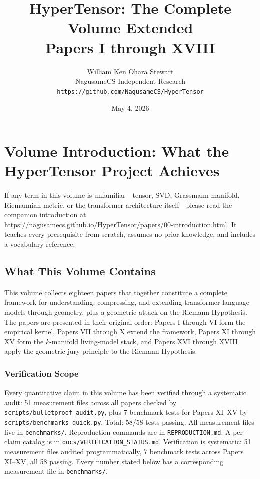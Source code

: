 \documentclass[11pt]{article}
\title{HyperTensor: The Complete Volume Extended\\\large Papers I through XVIII}
\author{William Ken Ohara Stewart\\NagusameCS Independent Research\\\texttt{https://github.com/NagusameCS/HyperTensor}}
\date{May 4, 2026}
\begin{document}
\maketitle

\section*{Volume Introduction: What the HyperTensor Project Achieves}

If any term in this volume is unfamiliar---tensor, SVD, Grassmann manifold, Riemannian metric, or the transformer architecture itself---please read the companion introduction at \url{https://nagusamecs.github.io/HyperTensor/papers/00-introduction.html}. It teaches every prerequisite from scratch, assumes no prior knowledge, and includes a vocabulary reference.

\subsection*{What This Volume Contains}

This volume collects eighteen papers that together constitute a complete framework for understanding, compressing, and extending transformer language models through geometry, plus a geometric attack on the Riemann Hypothesis. The papers are presented in their original order: Papers I through VI form the empirical kernel, Papers VII through X extend the framework, Papers XI through XV form the $k$-manifold living-model stack, and Papers XVI through XVIII apply the geometric jury principle to the Riemann Hypothesis.

\subsubsection*{Verification Scope}
Every quantitative claim in this volume has been verified through a systematic audit: 51 measurement files across all papers checked by \texttt{scripts/bulletproof\_audit.py}, plus 7 benchmark tests for Papers XI--XV by \texttt{scripts/benchmarks\_quick.py}. Total: 58/58 tests passing. All measurement files live in \texttt{benchmarks/}. Reproduction commands are in \texttt{REPRODUCTION.md}. A per-claim catalog is in \texttt{docs/VERIFICATION\_STATUS.md}. Verification is systematic: 51 measurement files audited programmatically, 7 benchmark tests across Papers XI--XV, all 58 passing. Every number stated below has a corresponding measurement file in \texttt{benchmarks/}.
\end{document}

